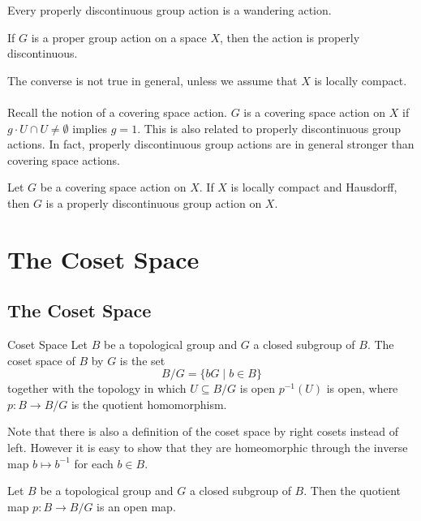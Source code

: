 \documentclass[a4paper]{article}
\begin{document}
\begin{prp}{}{} Every properly discontinuous group action is a wandering action. 
\end{prp}

\begin{prp}{}{} If $G$ is a proper group action on a space $X$, then the action is properly discontinuous. 
\end{prp}

The converse is not true in general, unless we assume that $X$ is locally compact. \\~\\

Recall the notion of a covering space action. $G$ is a covering space action on $X$ if $g\cdot U\cap U\neq\emptyset$ implies $g=1$. This is also related to properly discontinuous group actions. In fact, properly discontinuous group actions are in general stronger than covering space actions. 

\begin{prp}{}{} Let $G$ be a covering space action on $X$. If $X$ is locally compact and Hausdorff, then $G$ is a properly discontinuous group action on $X$. 
\end{prp}

\pagebreak
\section{The Coset Space}
\subsection{The Coset Space}
\begin{defn}{Coset Space}{} Let $B$ be a topological group and $G$ a closed subgroup of $B$. The coset space of $B$ by $G$ is the set $$B/G=\{bG\;|\;b\in B\}$$ together with the topology in which $U\subseteq B/G$ is open $p^{-1}(U)$ is open, where $p:B\to B/G$ is the quotient homomorphism. 
\end{defn}

Note that there is also a definition of the coset space by right cosets instead of left. However it is easy to show that they are homeomorphic through the inverse map $b\mapsto b^{-1}$ for each $b\in B$. 

\begin{prp}{}{} Let $B$ be a topological group and $G$ a closed subgroup of $B$. Then the quotient map $p:B\to B/G$ is an open map. 
\end{prp}
\end{document}
